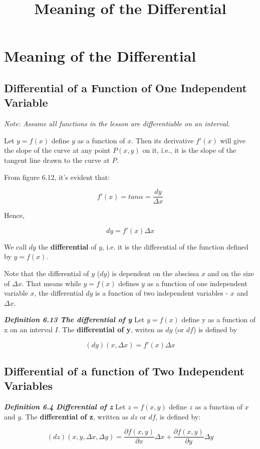 \documentclass{article}
\title{Meaning of the Differential}
\begin{document}
\section{Meaning of the Differential}

\subsection{Differential of a Function of One Independent Variable}

\emph{Note: Assume all functions in the lesson are \@{differentiable} on an \@{interval}.}

Let $y = f(x)$ define $y$ as a function of $x$. Then its derivative $f'(x)$ will give the slope of the curve at any point $P(x,y)$ on it, i.e., it is the slope of the tangent line drawn to the curve at $P$.

From figure 6.12, it's evident that:

\[ f'(x) = tan\alpha = \frac{dy}{\Delta x} \tag{6.1} \]

Hence,

\[ dy = f'(x)\Delta x \tag{6.11} \]

We call $dy$ the \textbf{differential} of $y$, i.e. it is the differential of the function defined by $y = f(x)$.

Note that the differential of $y$ ($dy$) is dependent on the abscissa $x$ and on the size of $\Delta x$. That means while $y = f(x)$ defines $y$ as a function of one independent variable $x$, the differential $dy$ is a function of two independent variables - $x$ and $\Delta x$.

\emph{\textbf{Definition 6.13 The differential of y}}
Let $y=f(x)$ define y as a function of x on an \@{interval} $I$. The \textbf{differential of y}, writen as $dy$ (or $df$) is defined by

\[ (dy)(x,\Delta x) = f'(x)\Delta x \tag{6.14} \]

\subsection{Differential of a function of Two Independent Variables}

\emph{\textbf{Definition 6.4 Differential of z}}
Let $z = f(x,y)$ define $z$ as a function of $x$ and $y$. The \textbf{differential of z}, written as $dz$ or $df$, is defined by:

\[ (dz)(x,y,\Delta x,\Delta y) = \frac{\partial f(x,y)}{\partial x}\Delta x + \frac{\partial f(x,y)}{\partial y}\Delta y \tag{6.41} \]
\end{document}
